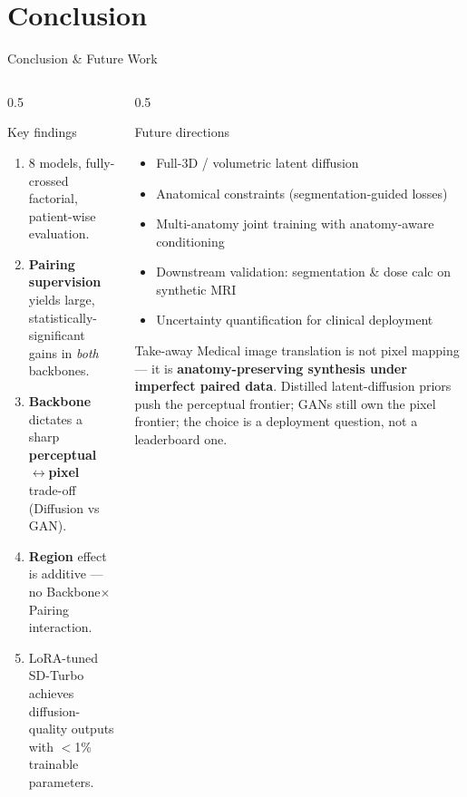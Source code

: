 \documentclass[aspectratio=169,10pt]{beamer}
\begin{document}
\section{Conclusion}
\begin{frame}{Conclusion \& Future Work}
\begin{columns}[T]
\begin{column}{0.5\textwidth}
\begin{block}{Key findings}
\footnotesize
\begin{enumerate}
    \item 8 models, fully-crossed factorial, patient-wise evaluation.
    \item \textbf{Pairing supervision} yields large, statistically-significant gains in \emph{both} backbones.
    \item \textbf{Backbone} dictates a sharp \textbf{perceptual$\leftrightarrow$pixel} trade-off (Diffusion vs GAN).
    \item \textbf{Region} effect is additive --- no Backbone$\times$Pairing interaction.
    \item LoRA-tuned SD-Turbo achieves diffusion-quality outputs with $<$1\% trainable parameters.
\end{enumerate}
\end{block}
\end{column}
\begin{column}{0.5\textwidth}
\begin{block}{Future directions}
\footnotesize
\begin{itemize}
    \item Full-3D / volumetric latent diffusion
    \item Anatomical constraints (segmentation-guided losses)
    \item Multi-anatomy joint training with anatomy-aware conditioning
    \item Downstream validation: segmentation \& dose calc on synthetic MRI
    \item Uncertainty quantification for clinical deployment
\end{itemize}
\end{block}
\begin{exampleblock}{Take-away}
\scriptsize
Medical image translation is not pixel mapping --- it is \textbf{anatomy-preserving synthesis under imperfect paired data}. Distilled latent-diffusion priors push the perceptual frontier; GANs still own the pixel frontier; the choice is a deployment question, not a leaderboard one.
\end{exampleblock}
\end{column}
\end{columns}
\end{frame}
\end{document}
